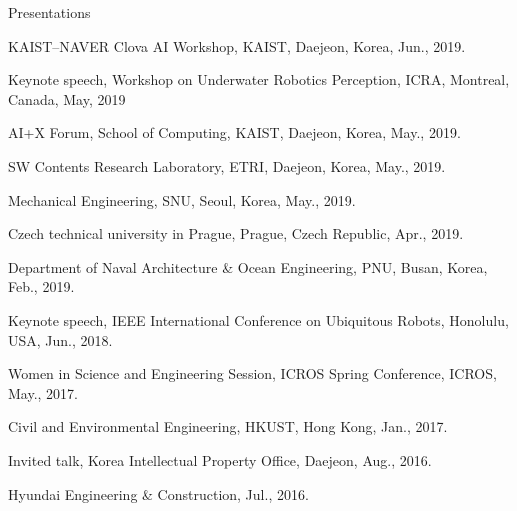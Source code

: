 \begin{rSection}{Presentations}
\begin{pubSubsectionNum}{}
  \item KAIST--NAVER Clova AI Workshop, \ac{KAIST}, Daejeon, Korea, Jun., 2019.

  \item Keynote speech, Workshop on Underwater Robotics Perception, ICRA, Montreal, Canada, May, 2019

  \item AI+X Forum, School of Computing, \ac{KAIST}, Daejeon, Korea, May., 2019.

  \item SW Contents Research Laboratory, \ac{ETRI}, Daejeon, Korea, May., 2019.

  \item Mechanical Engineering, \ac{SNU}, Seoul, Korea, May., 2019.

  \item Czech technical university in Prague, Prague, Czech Republic, Apr., 2019.

  \item Department of Naval Architecture \& Ocean Engineering, \ac{PNU}, Busan, Korea, Feb., 2019.





  \item Keynote speech, IEEE International Conference on Ubiquitous Robots, Honolulu, USA, Jun., 2018.

  \item Women in Science and Engineering Session, ICROS Spring Conference, \acf{ICROS}, May., 2017.

  \item Civil and Environmental Engineering, \ac{HKUST}, Hong Kong, Jan., 2017.

  \item Invited talk, Korea Intellectual Property Office, Daejeon, Aug., 2016.

  \item Hyundai Engineering \& Construction, Jul., 2016.


\end{pubSubsectionNum}
\end{rSection}
